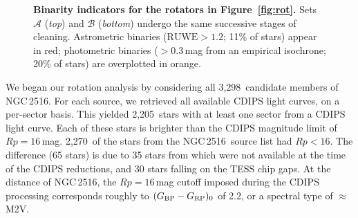 \documentclass[12pt,twocolumn,tighten]{aastex63}
\newcommand{\cn}{NGC\,2516} %
\newcommand{\nkinematic}{3{,}298} %
\newcommand{\ncdips}{2{,}205}
\newcommand{\nkinematicrpltsixteen}{2{,}270}
\newcommand{\bpmrpo}{(G_{\rm BP}-G_{\rm RP})_0}
\begin{document}
\begin{figure}[t]
	\begin{center}
		\leavevmode

    \vspace{-0.5cm}
	\end{center}
	\vspace{-0.7cm}
  \caption{ {\bf Binarity indicators for the rotators in
  Figure~\ref{fig:rot}.} Sets $\mathcal{A}$ ({\it top}) and
  $\mathcal{B}$ ({\it bottom}) undergo the same successive stages of
  cleaning.  Astrometric binaries ($\mathrm{RUWE}>1.2$; 11\% of stars)
  appear in red; photometric binaries ($>$0.3\,mag from an empirical
  isochrone; 20\% of stars) are overplotted in orange.  
  \label{fig:binarity}
	}
\end{figure}


We began our rotation analysis by considering all \nkinematic\
candidate members of \cn.  For each source, we retrieved all available
CDIPS light curves, on a per-sector basis.  This yielded \ncdips\
stars with at least one sector from a CDIPS light curve.  Each of
these stars is brighter than the CDIPS magnitude limit of
$Rp=16$\,mag.  \nkinematicrpltsixteen\ of the stars from the \cn\
source list had $Rp<16$.  The difference (65 stars) is due to 35 stars
from \citet{meingast_2021} which were not available at the time of the
CDIPS reductions, and 30 stars falling on the TESS chip gaps.  At the
distance of \cn, the $Rp=16$\,mag cutoff imposed during the CDIPS
processing corresponds roughly to $\bpmrpo$ of 2.2, or a spectral type
of $\approx$M2V.
\end{document}
